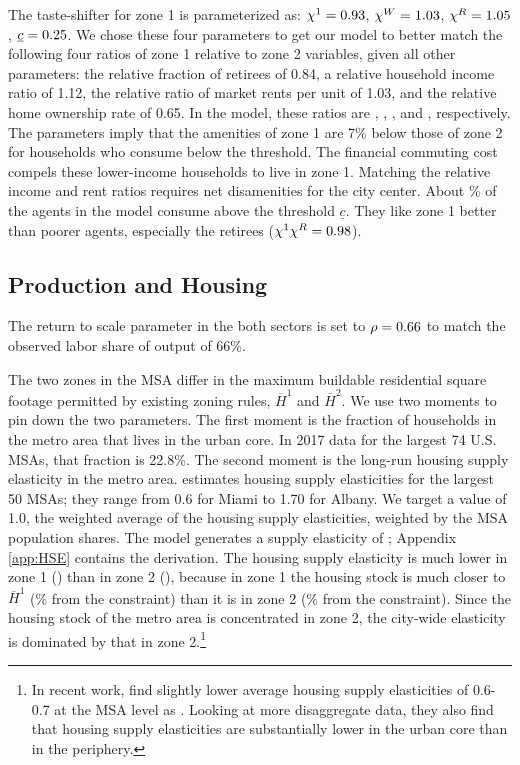 \documentclass[letterpaper,12pt,dvipsnames,usenames]{article}
\theoremstyle{definition}
\begin{document}
\begin{spacing}{1.25}
The taste-shifter for zone 1 is parameterized as: $\chi^{1}={0.93}$,  $\chi^{W}={1.03}$, $\chi^{R}={1.05}$, $\underline{c}={0.25}$.  We chose these four parameters to get our model to better match the following four ratios of zone 1 relative to zone 2 variables, given all other parameters: the relative fraction of retirees of 0.84, a relative household income ratio of 1.12, the relative ratio of market rents per unit of 1.03, and the relative home ownership rate of 0.65. In the model, these ratios are {\fracRetRel}, {\IncRel}, {\MedMktRentbySqftRel}, and {\HORel}, respectively. The parameters imply that the amenities of zone 1 are 7\% below those of zone 2 for households who consume below the threshold. The financial commuting cost compels these lower-income households to live in zone 1. Matching the relative income and rent ratios requires net disamenities for the city center. About {\cbarFrac}\% of the agents in the model consume above the threshold  $\underline{c}$. They like zone 1 better than poorer agents, especially the retirees ($\chi^1\chi^R={0.98}$).


\subsection{Production and Housing }
The return to scale parameter in the both sectors is set to $\rho={0.66}$ to match the observed labor share of output of 66\%.

The two zones in the MSA differ in the maximum buildable residential square footage permitted by existing zoning rules, $\overline{H}^{1}$ and $\overline{H}^{2}$. We use two moments to pin down the two parameters. The first moment is the fraction of households in the metro area that lives in the urban core. In 2017 data for the largest 74 U.S. MSAs, that fraction is 22.8\%. The second moment is the long-run housing supply elasticity in the metro area. \citet{Saiz:10} estimates housing supply elasticities for the largest 50 MSAs; they range from 0.6 for Miami to 1.70 for Albany. We target  a value of 1.0, the weighted average of the housing supply elasticities, weighted by the MSA population shares. The model generates a supply elasticity of {\HSE}; Appendix \ref{app:HSE} contains the derivation. The housing supply elasticity is much lower in zone 1 ({\HSEone}) than in zone 2 ({\HSEtwo}), because in zone 1 the housing stock is much closer to $\overline{H}^{1}$ ({\HbaroneDist}\% from the constraint) than it is in zone 2 ({\HbartwoDist}\% from the constraint). Since the housing stock of the metro area is concentrated in zone 2, the city-wide elasticity is dominated by that in zone 2.\footnote{In recent work, \citet{BaumHan2020} find slightly lower average housing supply elasticities of 0.6-0.7 at the MSA level as \citet{Saiz:10}. Looking at more disaggregate data, they also find that housing supply elasticities are substantially lower in the urban core than in the periphery.}


\end{spacing}
\end{document}
